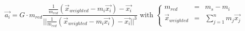 \documentclass{article}
\begin{document}
\begin{equation*}
\vec{a_i} = G \cdot m_{red} 
\frac
	{
		\frac
			{1}
			{m_{red}}(\vec{x}_{weighted} - m_i \vec{x_i}) - \vec{x_i}
	}
	{||
		\frac
			{1}
			{m_{red}}(\vec{x}_{weighted} - m_i \vec{x_i}) - \vec{x_i}
	||^3} \text{ with }
	\left\lbrace
	\begin{matrix}
		m_{red} &=& m_s - m_i \\
		\vec{x}_{weighted} &=& \sum_{j = 1}^{n} m_j \vec{x_j}
	\end{matrix}
	\right.
\end{equation*}
\end{document}
